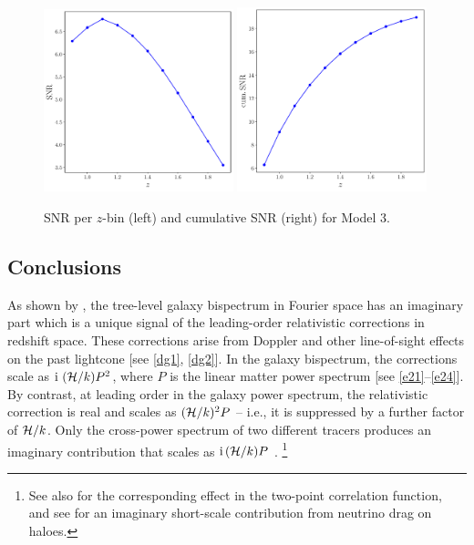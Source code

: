 \begin{figure}[!ht]
    \centering
    \includegraphics[width=0.49\textwidth]{fig/model3_perzbin.pdf}
    \includegraphics[width=0.49\textwidth]{fig/model3_cum.pdf}
    \caption{SNR per $z$-bin (left) and cumulative SNR (right) for Model 3.}
\end{figure}


\subsection{Conclusions}


As shown by \cite{Clarkson:2018dwn}, the tree-level galaxy bispectrum in Fourier space has an imaginary part which is a unique signal of the leading-order relativistic corrections in redshift space. These corrections arise from Doppler and other line-of-sight effects on the past lightcone [see \eqref{dg1}, \eqref{dg2}]. In the galaxy bispectrum, the corrections scale as ${\mathrm{i\,}}\,(\mathcal{H}/k)P^2$, where $P$ is the linear matter power spectrum [see \eqref{e21}--\eqref{e24}]. By contrast,  at leading order in the galaxy power spectrum, the relativistic correction is real and scales as $(\mathcal{H}/k)^2P$ -- i.e., it is suppressed by a further factor of  $\mathcal{H}/k$. 
Only the cross-power spectrum of two different tracers produces an imaginary contribution that scales as ${\mathrm{i\,}}(\mathcal{H}/k)P$ \cite{McDonald:2009dh}.
\footnote{See also \cite{Bonvin:2013ogt, Bonvin:2015kuc, Gaztanaga:2015jrs, Irsic:2015nla, Hall:2016bmm,Lepori:2017twd,Bonvin:2018ckp, Lepori:2019cqp} for the corresponding effect in the two-point correlation function, and see \cite{Okoli:2016vmd} for an imaginary {short-scale} contribution from neutrino drag on haloes.}


